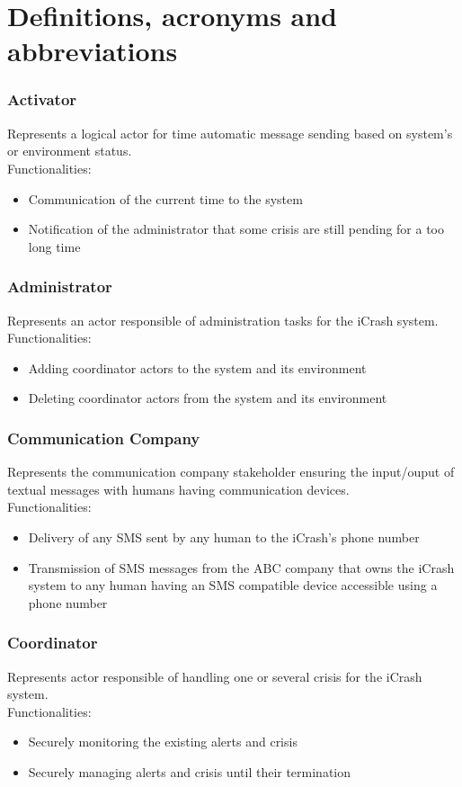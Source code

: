 \section{Definitions, acronyms and abbreviations}

\subsubsection{Activator}
Represents a logical actor for time automatic message sending based on system’s
or environment status.\\
Functionalities:
\begin{itemize}
  \item Communication of the current time to the system
  \item Notification of the administrator that some crisis are still pending for
  a too long time
\end{itemize}

\subsubsection{Administrator}
Represents an actor responsible of administration tasks for the iCrash system.\\
Functionalities:
\begin{itemize}
  \item Adding coordinator actors to the system and its environment
  \item Deleting coordinator actors from the system and its environment
\end{itemize}

\subsubsection{Communication Company}
Represents the communication company stakeholder ensuring the input/ouput of
textual messages with humans having communication devices.\\
Functionalities:
\begin{itemize}
  \item Delivery of any SMS sent by any human to the iCrash's phone number
  \item Transmission of SMS messages from the ABC company that owns the iCrash
  system to any human having an SMS compatible device accessible using a phone
  number
\end{itemize}

\subsubsection{Coordinator}
Represents actor responsible of handling one or several crisis for the iCrash
system.\\
Functionalities:
\begin{itemize}
  \item Securely monitoring the existing alerts and crisis
  \item Securely managing alerts and crisis until their termination
\end{itemize}

